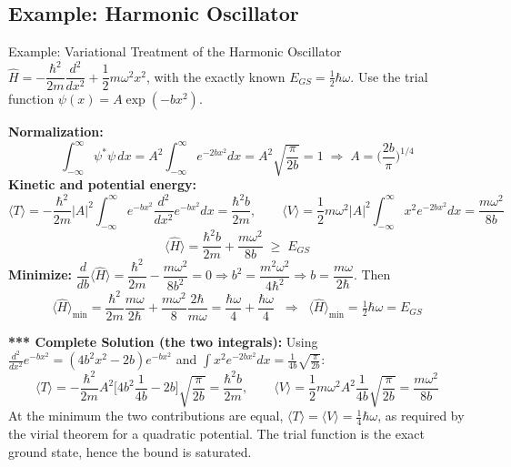 \documentclass[11pt,a4paper]{article}
\begin{document}
\subsection{Example: Harmonic Oscillator}
\begin{prob}{Example: Variational Treatment of the Harmonic Oscillator}
$\hat H = -\dfrac{\hbar^2}{2m}\dfrac{d^2}{dx^2} + \dfrac12m\omega^2x^2$, with the exactly known $E_{GS} = \tfrac12\hbar\omega$. Use the trial function $\psi(x) = A\exp(-bx^2)$.

\textbf{Normalization:}
\[
\int_{-\infty}^{\infty}\psi^*\psi\,dx = A^2\int_{-\infty}^{\infty}e^{-2bx^2}dx = A^2\sqrt{\frac{\pi}{2b}} = 1 \;\Longrightarrow\; A = \Big(\frac{2b}{\pi}\Big)^{1/4}
\]
\textbf{Kinetic and potential energy:}
\[
\langle T\rangle = -\frac{\hbar^2}{2m}|A|^2\int_{-\infty}^{\infty}e^{-bx^2}\frac{d^2}{dx^2}e^{-bx^2}dx = \frac{\hbar^2b}{2m}, \qquad
\langle V\rangle = \frac12m\omega^2|A|^2\int_{-\infty}^{\infty}x^2e^{-2bx^2}dx = \frac{m\omega^2}{8b}
\]
\[
\langle\hat H\rangle = \frac{\hbar^2b}{2m} + \frac{m\omega^2}{8b} \;\ge\; E_{GS}
\]
\textbf{Minimize:} $\dfrac{d}{db}\langle\hat H\rangle = \dfrac{\hbar^2}{2m} - \dfrac{m\omega^2}{8b^2} = 0 \Rightarrow b^2 = \dfrac{m^2\omega^2}{4\hbar^2}\Rightarrow b = \dfrac{m\omega}{2\hbar}$. Then
\[
\langle\hat H\rangle_{\min} = \frac{\hbar^2}{2m}\frac{m\omega}{2\hbar} + \frac{m\omega^2}{8}\frac{2\hbar}{m\omega} = \frac{\hbar\omega}{4} + \frac{\hbar\omega}{4} \;\;\Rightarrow\;\; \boxed{\langle\hat H\rangle_{\min} = \tfrac12\hbar\omega = E_{GS}}
\]
\end{prob}
\textbf{*** Complete Solution (the two integrals):} Using $\frac{d^2}{dx^2}e^{-bx^2} = (4b^2x^2-2b)e^{-bx^2}$ and $\int x^2e^{-2bx^2}dx = \frac1{4b}\sqrt{\frac{\pi}{2b}}$:
\[
\langle T\rangle = -\frac{\hbar^2}{2m}A^2\Big[4b^2\frac1{4b} - 2b\Big]\sqrt{\frac\pi{2b}} = \frac{\hbar^2b}{2m}, \qquad
\langle V\rangle = \frac12m\omega^2A^2\frac1{4b}\sqrt{\frac\pi{2b}} = \frac{m\omega^2}{8b}
\]
At the minimum the two contributions are equal, $\langle T\rangle = \langle V\rangle = \frac14\hbar\omega$, as required by the virial theorem for a quadratic potential. The trial function is the exact ground state, hence the bound is saturated.

\begin{center}
\end{center}
\end{document}
